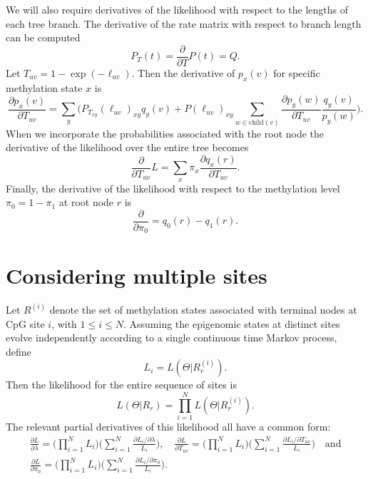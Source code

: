 \documentclass[11pt]{article}
\newcommand{\child}[1]{\ensuremath{\mathrm{child}(#1)}}
\newcommand{\tsum}{{\textstyle\sum}}
\newcommand{\tprod}{{\textstyle\prod}}
\begin{document}
We will also require derivatives of the likelihood with respect to the
lengths of each tree branch. The derivative of the rate matrix with
respect to branch length can be computed
\[
P_T (t) = \frac{\partial}{\partial T} P(t) = Q.
\]
Let $T_{uv} = 1 - \exp(-\ell_{uv})$. Then the derivative of $p_x(v)$
for specific methylation state $x$ is
\begin{equation}
\frac{\partial p_x(v)}{\partial T_{uv}} =
\sum_{y}
\Big(P_{T_{xy}}(\ell_{uv})_{xy} q_y(v) +
     P(\ell_{uv})_{xy}\sum_{w\in \child{v}}
     \frac{\partial p_y(w)}{\partial T_{uv}}\frac{q_y(v)}{p_y(w)}\Big).
\end{equation}
When we incorporate the probabilities associated with the root node
the derivative of the likelihood over the entire tree becomes
\begin{equation}
\frac{\partial}{\partial T_{uv}} L
=\sum_{x} \pi_{x} \frac{\partial q_x(r)}{\partial T_{uv}}.
\end{equation}
Finally, the derivative of the likelihood with respect to the
methylation level $\pi_0 = 1 - \pi_1$ at root node $r$ is
\[
\frac{\partial}{\partial \pi_0} = q_{0}(r) - q_1(r).
\]

\section{Considering multiple sites}

Let $R^{(i)}$ denote the set of methylation states associated with
terminal nodes at CpG site $i$, with $1\leq i\leq N$. Assuming the
epigenomic states at distinct sites evolve independently according to
a single continuous time Markov process, define
\[
L_i = L(\Theta|R^{(i)}_r).
\]
Then the likelihood for the entire sequence of sites is
\[
L(\Theta|R_r) = \prod_{i=1}^NL(\Theta|R^{(i)}_r).
\]
The relevant partial derivatives of this likelihood all have a common form:
\begin{gather*}
\frac{\partial L}{\partial \lambda} =
\Big(\tprod_{i=1}^N L_i\Big)\Big(\tsum_{i=1}^N \frac{\partial L_i/\partial \lambda}{L_i}\Big),\quad
\frac{\partial L}{\partial T_{uv}} =
\Big(\tprod_{i=1}^N L_i\Big)\Big(\tsum_{i=1}^N \frac{\partial L_i/\partial T_{uv}}{L_i}\Big)\quad \mbox{and}\\
\frac{\partial L}{\partial \pi_0} =
\Big(\tprod_{i=1}^N L_i\Big)\Big(\tsum_{i=1}^N \frac{\partial L_i/\partial \pi_0}{L_i}\Big).
\end{gather*}


\end{document}

